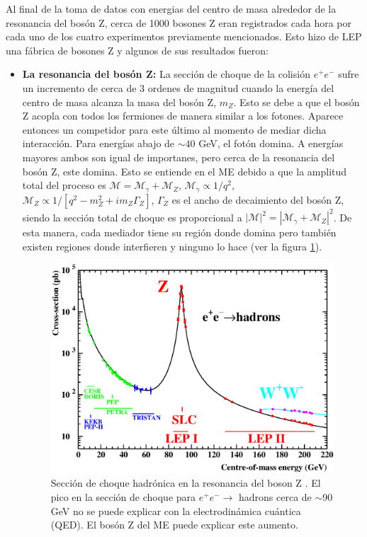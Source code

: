 Al final de la toma de datos con energias del centro de masa alrededor de la resonancia del bosón Z, cerca de 1000 bosones Z eran registrados cada hora por cada uno de los cuatro experimentos previamente mencionados. Esto hizo de LEP una fábrica de bosones Z y algunos de sus resultados fueron:
\begin{itemize}
	\item \textbf{La resonancia del bosón Z:} La sección de choque de la colisión $e^+e^-$ sufre un incremento de cerca de 3 ordenes de magnitud cuando la energía del centro de masa alcanza la masa del bosón Z, $m_Z$. Esto se debe a que el bosón Z acopla con todos los fermiones de manera similar a los fotones. Aparece entonces un competidor para este último al momento de mediar dicha interacción. Para energías abajo de $\sim 40$ GeV, el fotón domina. A energías mayores ambos son igual de importanes, pero cerca de la resonancia del bosón Z, este domina. Esto se entiende en el ME debido a que la amplitud total del proceso es $\mathcal{M}=\mathcal{M}_\gamma+\mathcal{M}_Z$, $\mathcal{M}_\gamma\propto 1/q^2 $, $\mathcal{M}_Z \propto 1/[q^2 -m_Z^2 + im_Z\Gamma_Z]$, $\Gamma_Z$ es el ancho de decaimiento del bosón Z, siendo la sección total de choque es proporcional a $|\mathcal{M}|^2=|\mathcal{M}_\gamma+\mathcal{M}_Z|^2$. De esta manera, cada mediador tiene su región donde domina pero también existen regiones donde interfieren y ninguno lo hace (ver la figura \ref{SMt1}).
	
	
\begin{figure}[h!]
\centering
\includegraphics[scale=0.55]{Images/SM-test-1.eps}
\caption[Sección de choque hadrónica en la resonancia del boson Z]{Sección de choque hadrónica en la resonancia del boson Z \cite{aleph2005precision}. El pico en la sección de choque para $e^+e^-\to$ hadrons cerca de $\sim$90 GeV no se puede explicar con la electrodinámica cuántica (QED). El bosón Z del ME puede explicar este aumento.}
\label{SMt1}
\end{figure}
	

\end{itemize}
